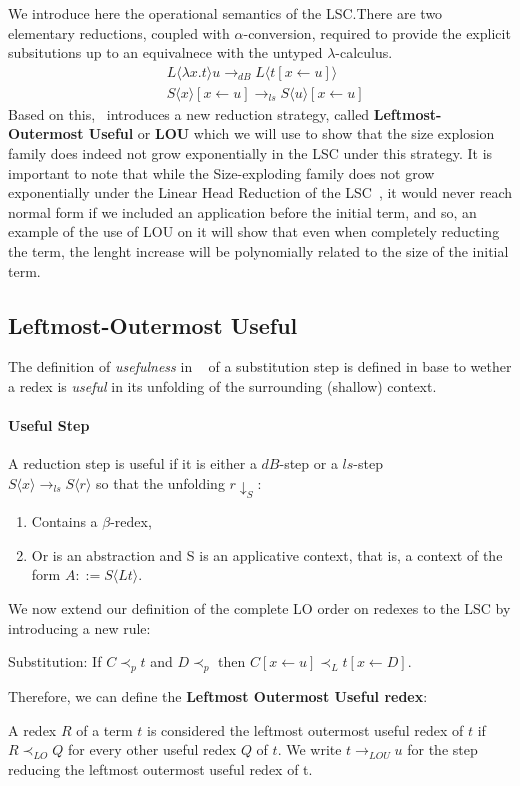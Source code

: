 \message{ !name(VU-CS-BSc-thesis-template.tex)}\documentclass[11pt]{article}
\begin{document}
We introduce here the operational semantics of the LSC.There are two elementary reductions, coupled with $\alpha$-conversion, required to provide the explicit subsitutions up to an equivalnece with the untyped $\lambda$-calculus.
\begin{equation}
  \begin{split}
    &L \langle \lambda x .t \rangle u \rightarrow_{dB} L \langle t [x \leftarrow u] \rangle \\
    &S \langle x \rangle [x \leftarrow u] \rightarrow_{ls} S \langle u \rangle [x \leftarrow u]
  \end{split}
\end{equation}
Based on this,~\cite{beta-invariance} introduces a new reduction strategy, called \textbf{Leftmost-Outermost Useful} or \textbf{LOU} which we will use to show that the size explosion family does indeed not grow exponentially in the LSC under this strategy. It is important to note that while the Size-exploding family does not grow exponentially under the Linear Head Reduction of the LSC~\cite{invariance-of-cost-model}, it would never reach normal form if we included an application before the initial term, and so, an example of the use of LOU on it will show that even when completely reducting the term, the lenght increase will be polynomially related to the size of the initial term.
\subsection{Leftmost-Outermost Useful}\label{lou}
The definition of \textit{usefulness} in ~\cite{beta-invariance} of a substitution step is defined in base to wether a redex is \textit{useful} in its unfolding of the surrounding (shallow) context.
\paragraph{Useful Step} A reduction step is useful if it is either a $dB$-step or a $ls$-step \\ $S\langle x \rangle \rightarrow_{ls} S\langle r \rangle$ so that the unfolding $r \downarrow_S$:
\begin{enumerate}
  \item Contains a $\beta$-redex,
  \item Or is an abstraction and S is an applicative context, that is, a context of the form $A ::= S\langle Lt \rangle$.
\end{enumerate}
We now extend our definition of the complete LO order on redexes to the LSC by introducing a new rule:
\begin{center}
  Substitution: If $C \prec_p t$ and $D \prec_p$ then $C[x \leftarrow u] \prec_L t[x \leftarrow D]$.
\end{center}
Therefore, we can define the \textbf{Leftmost Outermost Useful redex}:
\begin{center}
  A redex $R$ of a term $t$ is considered the leftmost outermost useful redex of $t$ if $R \prec_{LO} Q$ for every other useful redex $Q$ of $t$. We write $t \rightarrow_{LOU} u$ for the step reducing the leftmost outermost useful redex of t.
\end{center}
\end{document}
